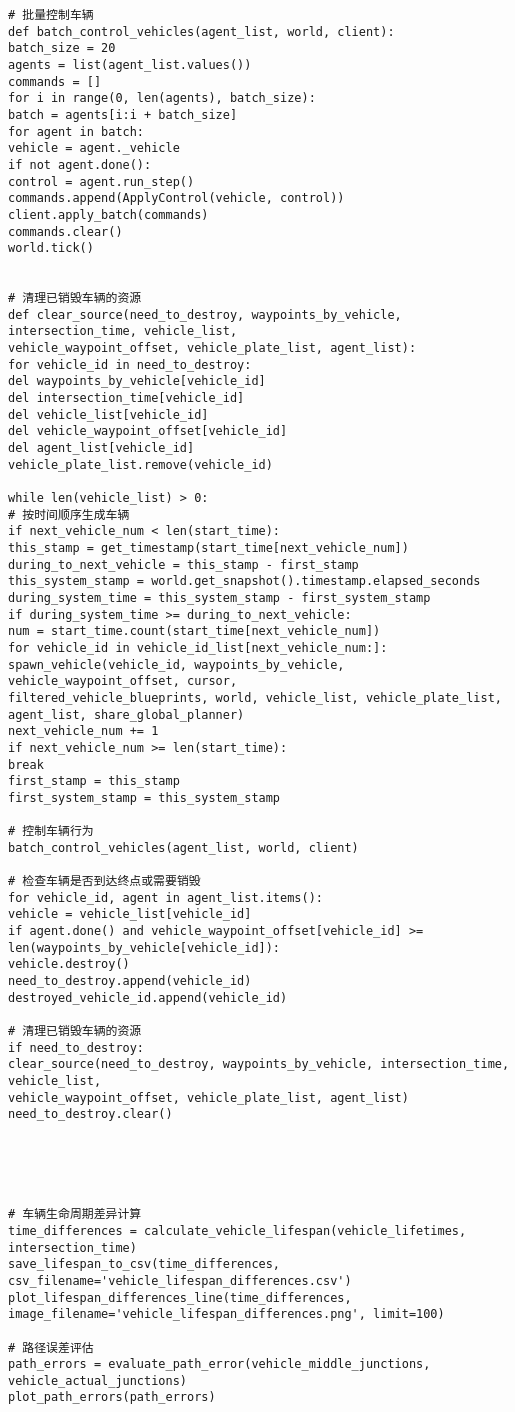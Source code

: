 \begin{lstlisting}
# 批量控制车辆
def batch_control_vehicles(agent_list, world, client):
batch_size = 20
agents = list(agent_list.values())
commands = []
for i in range(0, len(agents), batch_size):
batch = agents[i:i + batch_size]
for agent in batch:
vehicle = agent._vehicle
if not agent.done():
control = agent.run_step()
commands.append(ApplyControl(vehicle, control))
client.apply_batch(commands)
commands.clear()
world.tick()


# 清理已销毁车辆的资源
def clear_source(need_to_destroy, waypoints_by_vehicle, intersection_time, vehicle_list,
vehicle_waypoint_offset, vehicle_plate_list, agent_list):
for vehicle_id in need_to_destroy:
del waypoints_by_vehicle[vehicle_id]
del intersection_time[vehicle_id]
del vehicle_list[vehicle_id]
del vehicle_waypoint_offset[vehicle_id]
del agent_list[vehicle_id]
vehicle_plate_list.remove(vehicle_id)

while len(vehicle_list) > 0:
# 按时间顺序生成车辆
if next_vehicle_num < len(start_time):
this_stamp = get_timestamp(start_time[next_vehicle_num])
during_to_next_vehicle = this_stamp - first_stamp
this_system_stamp = world.get_snapshot().timestamp.elapsed_seconds
during_system_time = this_system_stamp - first_system_stamp
if during_system_time >= during_to_next_vehicle:
num = start_time.count(start_time[next_vehicle_num])
for vehicle_id in vehicle_id_list[next_vehicle_num:]:
spawn_vehicle(vehicle_id, waypoints_by_vehicle, vehicle_waypoint_offset, cursor,
filtered_vehicle_blueprints, world, vehicle_list, vehicle_plate_list, agent_list, share_global_planner)
next_vehicle_num += 1
if next_vehicle_num >= len(start_time):
break
first_stamp = this_stamp
first_system_stamp = this_system_stamp

# 控制车辆行为
batch_control_vehicles(agent_list, world, client)

# 检查车辆是否到达终点或需要销毁
for vehicle_id, agent in agent_list.items():
vehicle = vehicle_list[vehicle_id]
if agent.done() and vehicle_waypoint_offset[vehicle_id] >= len(waypoints_by_vehicle[vehicle_id]):
vehicle.destroy()
need_to_destroy.append(vehicle_id)
destroyed_vehicle_id.append(vehicle_id)

# 清理已销毁车辆的资源
if need_to_destroy:
clear_source(need_to_destroy, waypoints_by_vehicle, intersection_time, vehicle_list,
vehicle_waypoint_offset, vehicle_plate_list, agent_list)
need_to_destroy.clear()





# 车辆生命周期差异计算
time_differences = calculate_vehicle_lifespan(vehicle_lifetimes, intersection_time)
save_lifespan_to_csv(time_differences, csv_filename='vehicle_lifespan_differences.csv')
plot_lifespan_differences_line(time_differences, image_filename='vehicle_lifespan_differences.png', limit=100)

# 路径误差评估
path_errors = evaluate_path_error(vehicle_middle_junctions, vehicle_actual_junctions)
plot_path_errors(path_errors)
	
\end{lstlisting}



